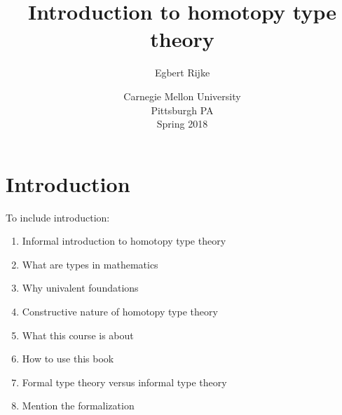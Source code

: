 \documentclass[11pt]{memoir} %
\title{Introduction to homotopy type theory}
\author{Egbert Rijke}
\date{Carnegie Mellon University\\Pittsburgh PA\\Spring 2018}%
\begin{document}
\frontmatter

\begin{titlingpage}
\maketitle 
\end{titlingpage}

\tableofcontents

%



\chapter{Introduction}

To include introduction:
\begin{enumerate}
\item Informal introduction to homotopy type theory
\item What are types in mathematics
\item Why univalent foundations
\item Constructive nature of homotopy type theory
\item What this course is about
\item How to use this book
\item Formal type theory versus informal type theory
\item Mention the formalization
\end{enumerate}

\mainmatter
































\end{document}
